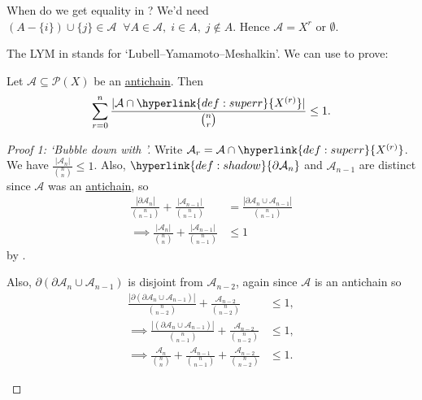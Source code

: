 \documentclass{article}
\newcommand{\A}{\mathcal{A}}
\let\subset\subseteq
\begin{document}
When do we get equality in ? We'd need $(A - \{i\}) \cup \{j\} \in \mathcal{A}\;\;\forall A \in \mathcal{A},\; i \in A,\; j \notin A$. Hence $\mathcal{A} = X^{r}$ or $\emptyset$.

The LYM in  stands for `Lubell–Yamamoto–Meshalkin'.
We can use  to prove:
\begin{nthm}[LYM]\label{thm:lym3}
  Let $\mathcal{A} \subset \mathcal{P}(X)$ be an \hyperlink{def:antichain}{antichain}.
  Then
  \begin{equation*}
    \sum_{r=0}^n \frac{|\mathcal{A} \cap \hyperlink{def:superr}{X^{(r)}}|}{\binom{n}{r}} \leq 1.
  \end{equation*}
\end{nthm}
\begin{proof}[Proof 1: `Bubble down with ']
  Write $\mathcal{A}_r = \mathcal{A} \cap \hyperlink{def:superr}{X^{(r)}}$.
  We have $\frac{|\mathcal{A}_n|}{\binom{n}{n}} \leq 1$.
  Also, $\hyperlink{def:shadow}{\partial \mathcal{A}_n}$ and $\mathcal{A}_{n-1}$ are distinct since $\mathcal{A}$ was an \hyperlink{def:antichain}{antichain}, so
  \begin{align*}
    \frac{|\partial \A_n|}{\binom{n}{n-1}} + \frac{|\A_{n-1}|}{\binom{n}{n-1}} &= \frac{|\partial \A_n \cup \A_{n-1}|}{\binom{n}{n-1}} \\
    \implies \frac{|\A_n|}{\binom{n}{n}} + \frac{|\A_{n-1}|}{\binom{n}{n-1}} &\leq 1
  \end{align*}
  by .

  Also, $\partial(\partial \mathcal{A}_n \cup \mathcal{A}_{n-1})$ is disjoint from $\mathcal{A}_{n-2}$, again since $\mathcal{A}$ is an antichain so
  \begin{align*}
    \frac{|\partial(\partial \A_n \cup \A_{n-1})|}{\binom{n}{n-2}} + \frac{\A_{n-2}}{\binom{n}{n-2}} &\leq 1, \\
    \implies \frac{|(\partial \mathcal{A}_n \cup \mathcal{A}_{n-1})|}{\binom{n}{n-1}} + \frac{\mathcal{A}_{n-2}}{\binom{n}{n-2}} &\leq 1, \\
    \implies \frac{\mathcal{A}_n}{\binom{n}{n}} + \frac{\mathcal{A}_{n-1}}{\binom{n}{n-1}} + \frac{\mathcal{A}_{n-2}}{\binom{n}{n-2}} &\leq 1.
  \end{align*}
  \begin{center}
\end{center}
\end{proof}
\end{document}
